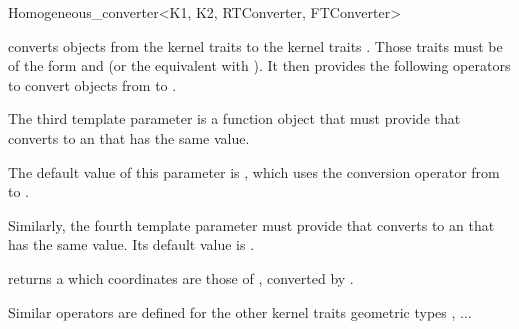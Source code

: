 \begin{ccRefClass}{Homogeneous_converter<K1, K2, RTConverter, FTConverter>}

\KernelRefLayout\gdef\ccTagOperatorLayout{\ccFalse}

\ccDefinition

\ccClassTemplateName converts objects from the kernel traits  to
the kernel traits .  Those traits must be of the form
 and  (or the equivalent with
).  It then provides the following operators to
convert objects from  to .

The third template parameter  is a function object that must
provide  that 
converts  to an  that has the same value.

The default value of this parameter is ,
which uses the conversion operator from
 to .

Similarly, the fourth template parameter must provide
 that
converts  to an  that has the same value.  Its
default value is  .


\ccCreation
{}


\ccOperations

{ returns a  which coordinates are those of ,
converted by .}

Similar operators are defined for the other kernel traits geometric types
, ...

\ccSeeAlso
{} \\
 \\

\end{ccRefClass}
